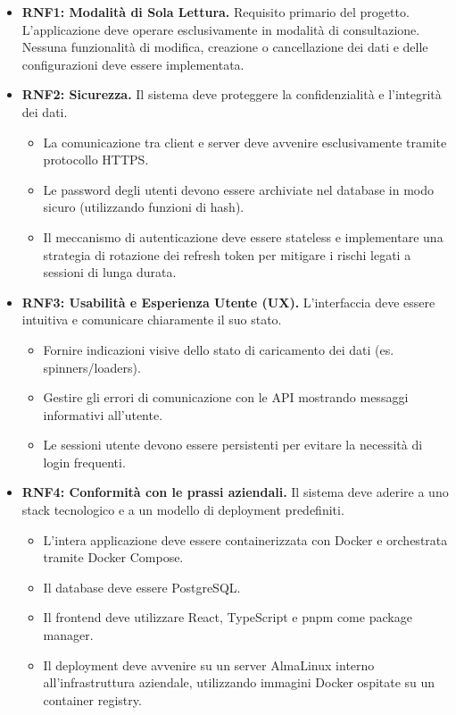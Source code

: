 \documentclass[12pt,a4paper,openright,twoside]{book}
\begin{document}
\begin{itemize}
    \item \textbf{RNF1: Modalità di Sola Lettura.} Requisito primario del progetto. L'applicazione deve operare esclusivamente in modalità di consultazione. Nessuna funzionalità di modifica, creazione o cancellazione dei dati e delle configurazioni deve essere implementata.
        
    \item \textbf{RNF2: Sicurezza.} Il sistema deve proteggere la confidenzialità e l'integrità dei dati.
        \begin{itemize}
            \item La comunicazione tra client e server deve avvenire esclusivamente tramite protocollo HTTPS.
            \item Le password degli utenti devono essere archiviate nel database in modo sicuro (utilizzando funzioni di hash).
            \item Il meccanismo di autenticazione deve essere stateless e implementare una strategia di rotazione dei refresh token per mitigare i rischi legati a sessioni di lunga durata.
        \end{itemize}

    \item \textbf{RNF3: Usabilità e Esperienza Utente (UX).} L'interfaccia deve essere intuitiva e comunicare chiaramente il suo stato.
        \begin{itemize}
            \item Fornire indicazioni visive dello stato di caricamento dei dati (es. spinners/loaders).
            \item Gestire gli errori di comunicazione con le API mostrando messaggi informativi all'utente.
            \item Le sessioni utente devono essere persistenti per evitare la necessità di login frequenti.
        \end{itemize}


    \item \textbf{RNF4: Conformità con le prassi aziendali.} Il sistema deve aderire a uno stack tecnologico e a un modello di deployment predefiniti.
        \begin{itemize}
            \item L'intera applicazione deve essere containerizzata con Docker e orchestrata tramite Docker Compose.
            \item Il database deve essere PostgreSQL.
            \item Il frontend deve utilizzare React, TypeScript e pnpm come package manager.
            \item Il deployment deve avvenire su un server AlmaLinux interno all'infrastruttura aziendale, utilizzando immagini Docker ospitate su un container registry.
        \end{itemize}

\end{itemize}
\end{document}

